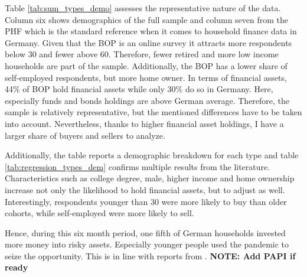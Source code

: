 \documentclass[ProjectABM]{subfiles}
\begin{document}
%



Table \ref{tab:sum_types_demo} assesses the representative nature of the data. Column six shows demographics of the full sample and column seven from the PHF which is the standard reference when it comes to household finance data in Germany. Given that the BOP is an online survey it attracts more respondents below 30 and fewer above 60. Therefore, fewer retired and more low income households are part of the sample. Additionally, the BOP has a lower share of self-employed respondents, but more home owner. In terms of financial assets, 44\% of BOP hold financial assets while only 30\% do so in Germany. Here, especially funds and bonds holdings are above German average. Therefore, the sample is relatively representative, but the mentioned differences have to be taken into account. Nevertheless, thanks to higher financial asset holdings, I have a larger share of buyers and sellers to analyze.

Additionally, the table reports a demographic breakdown for each type and table \ref{tab:regression_types_dem} confirms multiple results from the literature. Characteristics such as college degree, male, higher income and home ownership increase not only the likelihood to hold financial assets, but to adjust as well. Interestingly, respondents younger than 30 were more likely to buy than older cohorts, while self-employed were more likely to sell.

Hence, during this six month period, one fifth of German households invested more money into risky assets. Especially younger people used the pandemic to seize the opportunity. This is in line with reports from \cite{DAI_2021}. \textbf{NOTE: Add PAPI if ready}

\end{document}
